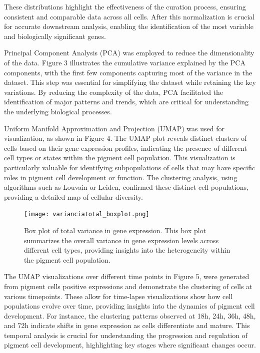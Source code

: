 \documentclass[runningheads]{llncs}
\begin{document}
These distributions highlight the effectiveness of the curation process, ensuring consistent and comparable data across all cells. After this normalization is crucial for accurate downstream analysis, enabling the identification of the most variable and biologically significant genes.

Principal Component Analysis (PCA) was employed to reduce the dimensionality of the data. Figure 3 illustrates the cumulative variance explained by the PCA components, with the first few components capturing most of the variance in the dataset. This step was essential for simplifying the dataset while retaining the key variations. By reducing the complexity of the data, PCA facilitated the identification of major patterns and trends, which are critical for understanding the underlying biological processes.

Uniform Manifold Approximation and Projection (UMAP) was used for visualization, as shown in Figure 4. The UMAP plot reveals distinct clusters of cells based on their gene expression profiles, indicating the presence of different cell types or states within the pigment cell population. This visualization is particularly valuable for identifying subpopulations of cells that may have specific roles in pigment cell development or function. The clustering analysis, using algorithms such as Louvain or Leiden, confirmed these distinct cell populations, providing a detailed map of cellular diversity.

\begin{figure}[H]
  \centering
  \texttt{[image: varianciatotal\_boxplot.png]}
  \caption{Box plot of total variance in gene expression. This box plot summarizes the overall variance in gene expression levels across different cell types, providing insights into the heterogeneity within the pigment cell population.}
  \label{results 1}
\end{figure}

The UMAP visualizations over different time points in Figure 5, were generated from pigment cells positive expressions and demonstrate the clustering of cells at various timepoints. These allow for time-lapse visualizations show how cell populations evolve over time, providing insights into the dynamics of pigment cell development. For instance, the clustering patterns observed at 18h, 24h, 36h, 48h, and 72h indicate shifts in gene expression as cells differentiate and mature. This temporal analysis is crucial for understanding the progression and regulation of pigment cell development, highlighting key stages where significant changes occur.
\end{document}
